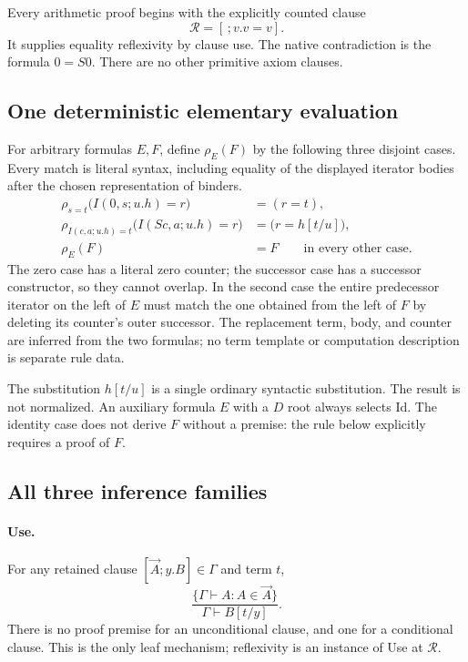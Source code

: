 \documentclass[11pt,letterpaper]{article}
\theoremstyle{definition}\newtheorem{definition}[theorem]{Definition}
\theoremstyle{remark}\newtheorem{remark}[theorem]{Remark}
\begin{document}
Every arithmetic proof begins with the explicitly counted clause
\[
                  \boxed{\mathcal R=[\,;v.v=v].}
\]
It supplies equality reflexivity by clause use. The native contradiction
is the formula $0=S0$. There are no other primitive axiom clauses.

\subsection{One deterministic elementary evaluation}

For arbitrary formulas $E,F$, define $\rho_E(F)$ by the following three
disjoint cases. Every match is literal syntax, including equality of the
displayed iterator bodies after the chosen representation of binders.
\begin{align}
 \rho_{s=t}\bigl(I(0,s;u.h)=r\bigr)&=(r=t),
       \tag{Z}\label{eq:rho-zero}\\
 \rho_{I(c,a;u.h)=t}\bigl(I(Sc,a;u.h)=r\bigr)
       &=\bigl(r=h[t/u]\bigr),
       \tag{S}\label{eq:rho-succ}\\
 \rho_E(F)&=F\qquad\text{in every other case}.
       \tag{Id}\label{eq:rho-id}
\end{align}
The zero case has a literal zero counter; the successor case has a
successor constructor, so they cannot overlap. In the second case the
entire predecessor iterator on the left of $E$ must match the one obtained
from the left of $F$ by deleting its counter's outer successor.
The replacement term, body, and counter are inferred from the two formulas;
no term template or computation description is separate rule data.

The substitution $h[t/u]$ is a single ordinary syntactic substitution.
The result is not normalized. An auxiliary formula $E$ with a $D$ root
always selects Id. The identity case does not derive $F$ without a premise:
the rule below explicitly requires a proof of $F$.

\subsection{All three inference families}

\paragraph{Use.}
For any retained clause $[\vec A;y.B]\in\Gamma$ and term $t$,
\[
 \frac{\{\Gamma\vdash A:A\in\vec A\}}
      {\Gamma\vdash B[t/y]}.
 \tag{Use}\label{eq:raw-use}
\]
There is no proof premise for an unconditional clause, and one for a
conditional clause. This is the only leaf mechanism; reflexivity is an
instance of Use at $\mathcal R$.
\end{document}
